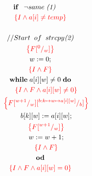 \documentclass [a4paper, 12pt, fleqn]  {article}
\newcommand{\assn}[1]{{\color{red}\left\{#1\right\}}}
\begin{document}
\begin{gather*}
\hspace{0.6cm} \IF \hspace{0.3cm} \neg same \hspace{0.1cm} \textit{(1)} \\
\hspace{1.2cm} \assn{ I \AND a[i] \neq temp  } \\ \\
\hspace{1.2cm} //Start \hspace{0.2cm} of \hspace{0.2cm} strcpy \textit{(2)} \\  %
\hspace{1.2cm} \assn{F \subst 0w}\\
\hspace{1.2cm} w \Ass 0; \\
\hspace{1.2cm} \assn{I \AND F} \\
\hspace{1.2cm} \WHILE \hspace{0.1cm} a[i][w] \neq 0 \hspace{0.1cm} \DO \\
\hspace{1.2cm} \hspace{0.6cm} \assn{I \AND F \AND a[i][w] \neq 0 }\\
\hspace{1.2cm} \hspace{0.6cm} \assn{F \subst {w + 1} w \subst{ b:k \mapsto w \mapsto a[i][w]}  b    } \\
\hspace{1.2cm} \hspace{0.6cm} b[k][w] \Ass a[i][w]; \\
\hspace{1.2cm} \hspace{0.6cm} \assn{ F \subst {w + 1} w  } \\
\hspace{1.2cm} \hspace{0.6cm} w \Ass w + 1; \\
\hspace{1.2cm} \hspace{0.6cm} \assn{ I \AND F} \\
\hspace{1.2cm} \OD \\
\hspace{1.2cm} \assn{ I \AND F \AND  a[i][w] = 0 } \\

\end{gather*}
\end{document}
